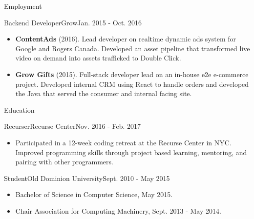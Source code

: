 \documentclass[]{mcdowellcv}
\begin{document}
\begin{cvsection}{Employment}
        \begin{cvsubsection}{Backend Developer}{Grow}{Jan. 2015 - Oct. 2016}
            \begin{itemize}
                \item \textbf{ContentAds} (2016). Lead developer on realtime dynamic ads system for Google and Rogers Canada. Developed an asset pipeline that transformed live video on demand into assets trafficked to Double Click.
            \end{itemize}
            \begin{itemize}
                \item \textbf{Grow Gifts} (2015). Full-stack developer lead on an in-house e2e e-commerce project. Developed internal CRM using React to handle orders and developed the Java that served the consumer and internal facing site.
            \end{itemize}
        \end{cvsubsection}
    \end{cvsection}

    \begin{cvsection}{Education}
        \begin{cvsubsection}{Recurser}{Recurse Center}{Nov. 2016 - Feb. 2017}
            \begin{itemize}
                \item Participated in a 12-week coding retreat at the Recurse Center in NYC.\newline 
                Improved programming skills through project based learning, mentoring, and pairing with other programmers.
            \end{itemize}
        \end{cvsubsection}
        \begin{cvsubsection}{Student}{Old Dominion University}{Sept. 2010 - May 2015}
            \begin{itemize}
                \item Bachelor of Science in Computer Science, May 2015.
                \item Chair Association for Computing Machinery, Sept. 2013 - May 2014.
            \end{itemize}
        \end{cvsubsection}
    \end{cvsection}
\end{document}
